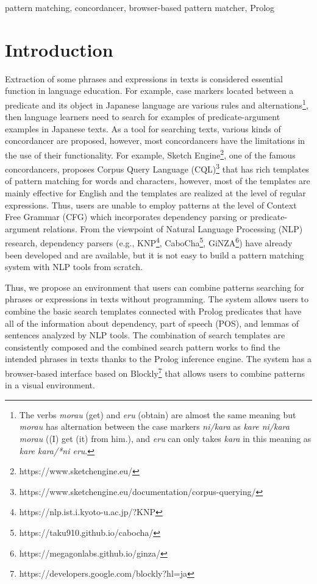 \documentclass[conference]{IEEEtran}
\begin{document}
\begin{IEEEkeywords}
  pattern matching, concordancer, browser-based pattern matcher, Prolog
\end{IEEEkeywords}

\section{Introduction}
Extraction of some phrases and expressions in texts is considered essential function in language education.
For example, case markers located between a predicate and its object in Japanese language are various
rules and alternations\footnote{The verbs {\it morau} (get) and {\it eru} (obtain) are almost the same meaning
  but {\it morau} has alternation between the case markers {\it ni/kara} as {\it kare ni/kara morau}
  ((I) get (it) from him.), and
    {\it eru} can only takes {\it kara} in this meaning as {\it kare kara/*ni eru}.},
then language learners need to search for examples of predicate-argument
examples in Japanese texts.
As a tool for searching texts, various kinds of concordancer are proposed, however,
most concordancers have the limitations in the use of their functionality.
For example, Sketch Engine\footnote{https://www.sketchengine.eu/}, one of the famous concordancers,
proposes Corpus Query Language (CQL)\footnote{https://www.sketchengine.eu/documentation/corpus-querying/}
that has rich templates of pattern matching for words and characters, however,
most of the templates are mainly effective for English and the templates are realized
at the level of regular expressions. Thus, users are unable to employ patterns at the level of Context
Free Grammar (CFG) which incorporates dependency parsing or predicate-argument relations.
From the viewpoint of Natural Language Processing (NLP) research,
dependency parsers (e.g., KNP\footnote{https://nlp.ist.i.kyoto-u.ac.jp/?KNP}, CaboCha\footnote{https://taku910.github.io/cabocha/}, GiNZA\footnote{https://megagonlabs.github.io/ginza/}) have already been developed and are available, but it is not easy to
build a pattern matching system with NLP tools from scratch.

Thus, we propose an environment that users can combine patterns
searching for phrases or expressions in texts without programming.
The system allows users to combine the basic search templates
connected with Prolog predicates that have all of the information
about dependency, part of speech (POS), and lemmas of sentences analyzed by NLP tools.
The combination of search templates are consistently composed and the
combined search pattern works to find the intended phrases in texts thanks to
the Prolog inference engine.
The system has a browser-based interface based on Blockly\footnote{https://developers.google.com/blockly?hl=ja}
that allows users to combine patterns in a visual environment.
\end{document}
